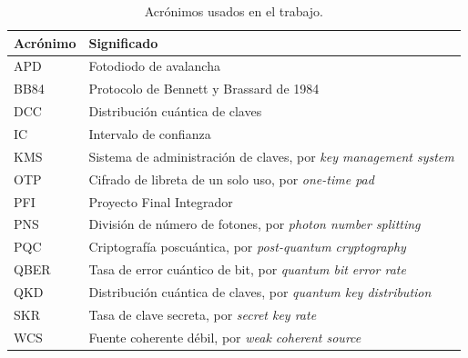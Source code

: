 \begin{table}[H]
  \centering
  \begin{tabular}{ll}
    \toprule
    Acrónimo & Significado \\
    \midrule
    APD & Fotodiodo de avalancha \\
    BB84 & Protocolo de Bennett y Brassard de 1984 \\
    DCC & Distribución cuántica de claves \\
    IC & Intervalo de confianza \\
    KMS & Sistema de administración de claves, por \textit{key management system} \\
    OTP & Cifrado de libreta de un solo uso, por \textit{one-time pad} \\
    PFI & Proyecto Final Integrador \\
    PNS & División de número de fotones, por \textit{photon number splitting} \\
    PQC & Criptografía poscuántica, por \textit{post-quantum cryptography} \\
    QBER & Tasa de error cuántico de bit, por \textit{quantum bit error rate} \\
    QKD & Distribución cuántica de claves, por \textit{quantum key distribution} \\
    SKR & Tasa de clave secreta, por \textit{secret key rate} \\
    WCS & Fuente coherente débil, por \textit{weak coherent source} \\
    \bottomrule
  \end{tabular}
  \caption{Acrónimos usados en el trabajo.}
  \label{tab:acronimos}
\end{table}
